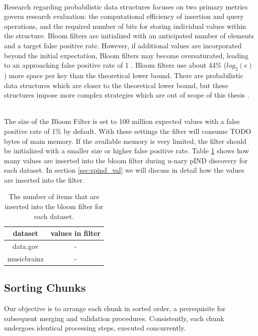 \noindent \\ Research regarding probabilistic data structures focuses on two primary metrics govern research evaluation: the computational efficiency of insertion and query operations, and the required number of bits for storing individual values within the structure\cite{fan2014cuckoo}. Bloom filters are initialized with an anticipated number of elements and a target false positive rate. However, if additional values are incorporated beyond the initial expectation, Bloom filters may become oversaturated, leading to an approaching false positive rate of 1 \cite{tarkoma2011theory}. Bloom filters use about 44\% ($log_2(e)$) more space per key than the theoretical lower bound. There are probabilistic data structures which are closer to the theoretical lower bound, but these structures impose more complex strategies which are out of scope of this thesis \cite{fan2014cuckoo}.

\noindent \\ The size of the Bloom Filter is set to 100 million expected values with a false positive rate of 1\% by default. With these settings the filter will consume TODO bytes of main memory. If the available memory is very limited, the filter should be initialized with a smaller size or higher false positive rate. Table \ref{tab:filter} shows how many values are inserted into the bloom filter during u-nary pIND discovery for each dataset. In section \ref{sec:spind_val} we will discuss in detail how the values are inserted into the filter.

\begin{table}
    \begin{tabular}{c|c}
     dataset & values in filter\\ 
     \hline\hline
     data.gov & - \\ 
     \hline
     musicbrainz & - \\
    \end{tabular}
    \caption{The number of items that are inserted into the bloom filter for each dataset.} \label{tab:filter}
\end{table}


\subsection{Sorting Chunks}
Our objective is to arrange each chunk in sorted order, a prerequisite for subsequent merging and validation procedures. Consistently, each chunk undergoes identical processing steps, executed concurrently.

